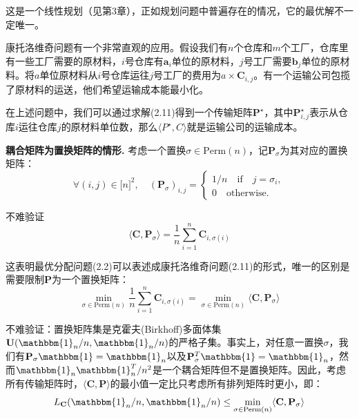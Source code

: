 \documentclass[cn,10pt,math=newtx,citestyle=gb7714-2015,bibstyle=gb7714-2015]{elegantbook}
\begin{document}
这是一个线性规划（见第3章），正如规划问题中普遍存在的情况，它的最优解不一定唯一。

\begin{postulate}[矿石与工厂问题]

康托洛维奇问题有一个非常直观的应用。假设我们有$n$个仓库和$m$个工厂，仓库里有一些工厂需要的原材料，$i$号仓库有$\mathbf{a}_i$单位的原材料，$j$号工厂需要$\mathbf{b}_j$单位的原材料。将$a$单位原材料从$i$号仓库运往$j$号工厂的费用为$a\times \mathbf{C}_{i,j}$。有一个运输公司包揽了原材料的运送，他们希望运输成本能最小化。

在上述问题中，我们可以通过求解(2.11)得到一个传输矩阵$\mathbf{P}^\star$，其中$\mathbf{P}^\star_{i,j}$表示从仓库$i$运往仓库$j$的原材料单位数，那么$\langle P^\star ,C\rangle$就是运输公司的运输成本。

\end{postulate}

\textbf{耦合矩阵为置换矩阵的情形. } 考虑一个置换$\sigma\in\text{Perm}(n)$，记$\mathbf{P}_\sigma$为其对应的置换矩阵：
\begin{equation}
    \label{2.12}
    \forall (i,j)\in\mathbb{[}n\mathbb{]}^2,\quad (\mathbf{P}_\sigma)_{i,j}=\left\{ \begin{array}{l}1/n \quad \text{if} \quad j=\sigma_i,\\ 0 \quad \text{otherwise}.\end{array} \right.
\end{equation}

不难验证
\begin{equation*}
    \langle \mathbf{C},\mathbf{P}_\sigma \rangle = \frac{1}{n}\sum_{i=1}^n \mathbf{C}_{i,\sigma(i)}
\end{equation*}

这表明最优分配问题(2.2)可以表述成康托洛维奇问题(2.11)的形式，唯一的区别是需要限制$\mathbf{P}$为一个置换矩阵：
\begin{equation*}
    \min\limits_{\sigma\in\text{Perm}(n)}\frac{1}{n}\sum_{i=1}^n \mathbf{C}_{i,\sigma(i)}=\min\limits_{\sigma\in\text{Perm}(n)} \langle \mathbf{C},\mathbf{P}_\sigma \rangle
\end{equation*}

不难验证：置换矩阵集是克霍夫(Birkhoff)多面体集$\mathbf{U}(\mathbbm{1}_n/n,\mathbbm{1}_n/n)$的严格子集。事实上，对任意一置换$\sigma$，我们有$\mathbf{P}_\sigma \mathbbm{1}=\mathbbm{1}_n$以及$\mathbf{P}^T_\sigma \mathbbm{1}=\mathbbm{1}_n$，然而$\mathbbm{1}_n\mathbbm{1}_n^T/n^2$是一个耦合矩阵但不是置换矩阵。因此，考虑所有传输矩阵时，$\langle \mathbf{C,P}\rangle$的最小值一定比只考虑所有排列矩阵时更小，即：
\begin{equation*}
    L_\mathbf{C}(\mathbbm{1}_n/n,\mathbbm{1}_n/n)\leq \min\limits_{\sigma\in\text{Perm}(n)}\langle \mathbf{C},\mathbf{P}_\sigma \rangle
\end{equation*}
\end{document}
